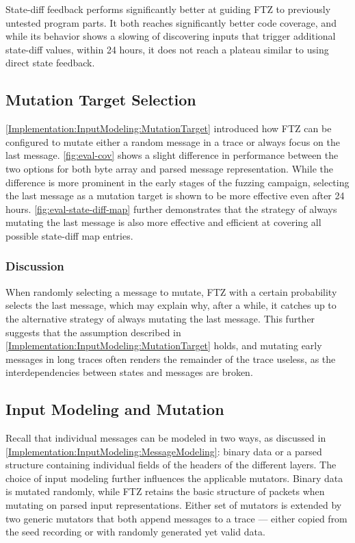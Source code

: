 \documentclass[twocolumn]{article}
\newcommand{\proj}{FTZ\xspace}
\begin{document}
State-diff feedback performs significantly better at guiding \proj to previously untested program parts. It both reaches significantly better code coverage, and while its behavior shows a slowing of discovering inputs that trigger additional state-diff values, within 24 hours, it does not reach a plateau similar to using direct state feedback.

\subsection{Mutation Target Selection}
\label{Results:TargetSelection}

\cref{Implementation:InputModeling:MutationTarget} introduced how \proj can be configured to mutate either a random message in a trace or always focus on the last message. \cref{fig:eval-cov} shows a slight difference in performance between the two options for both byte array and parsed message representation. While the difference is more prominent in the early stages of the fuzzing campaign, selecting the last message as a mutation target is shown to be more effective even after 24 hours. \cref{fig:eval-state-diff-map} further demonstrates that the strategy of always mutating the last message is also more effective and efficient at covering all possible state-diff map entries.

\subsubsection*{Discussion}

When randomly selecting a message to mutate, \proj with a certain probability selects the last message, which may explain why, after a while, it catches up to the alternative strategy of always mutating the last message. This further suggests that the assumption described in \cref{Implementation:InputModeling:MutationTarget} holds, and mutating early messages in long traces often renders the remainder of the trace useless, as the interdependencies between states and messages are broken.

\subsection{Input Modeling and Mutation}
\label{Results:InputModeling}

Recall that individual messages can be modeled in two ways, as discussed in \cref{Implementation:InputModeling:MessageModeling}: binary data or a parsed structure containing individual fields of the headers of the different layers. The choice of input modeling further influences the applicable mutators. Binary data is mutated randomly, while \proj retains the basic structure of packets when mutating on parsed input representations. Either set of mutators is extended by two generic mutators that both append messages to a trace — either copied from the seed recording or with randomly generated yet valid data.
\end{document}
